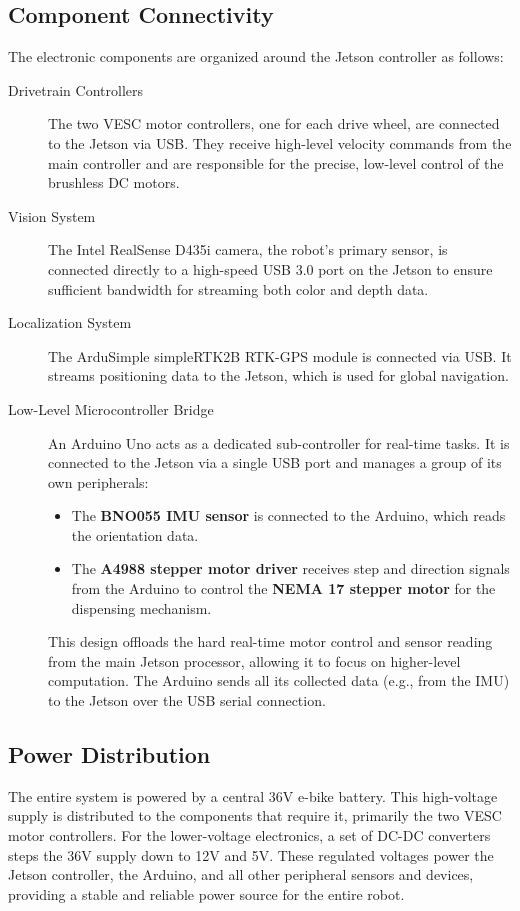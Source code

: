 \subsection{Component Connectivity}
The electronic components are organized around the Jetson controller as follows:
\begin{description}
    \item[Drivetrain Controllers] The two VESC motor controllers, one for each drive wheel, are connected to the Jetson via USB. They receive high-level velocity commands from the main controller and are responsible for the precise, low-level control of the brushless DC motors.
    \item[Vision System] The Intel RealSense D435i camera, the robot's primary sensor, is connected directly to a high-speed USB 3.0 port on the Jetson to ensure sufficient bandwidth for streaming both color and depth data.
    \item[Localization System] The ArduSimple simpleRTK2B RTK-GPS module is connected via USB. It streams positioning data to the Jetson, which is used for global navigation.
    \item[Low-Level Microcontroller Bridge] An Arduino Uno acts as a dedicated sub-controller for real-time tasks. It is connected to the Jetson via a single USB port and manages a group of its own peripherals:
    \begin{itemize}
        \item The \textbf{BNO055 IMU sensor} is connected to the Arduino, which reads the orientation data.
        \item The \textbf{A4988 stepper motor driver} receives step and direction signals from the Arduino to control the \textbf{NEMA 17 stepper motor} for the dispensing mechanism.
    \end{itemize}
    This design offloads the hard real-time motor control and sensor reading from the main Jetson processor, allowing it to focus on higher-level computation. The Arduino sends all its collected data (e.g., from the IMU) to the Jetson over the USB serial connection.
\end{description}

\subsection{Power Distribution}
The entire system is powered by a central 36V e-bike battery. This high-voltage supply is distributed to the components that require it, primarily the two VESC motor controllers. For the lower-voltage electronics, a set of DC-DC converters steps the 36V supply down to 12V and 5V. These regulated voltages power the Jetson controller, the Arduino, and all other peripheral sensors and devices, providing a stable and reliable power source for the entire robot.

